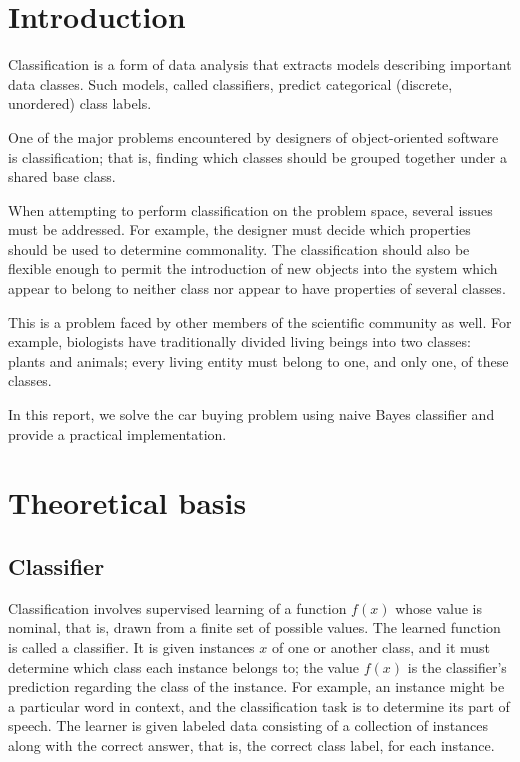 \documentclass[a4paper]{article}
\begin{document}

\newpage
\tableofcontents
\newpage

\section{Introduction}

	Classification is a form of data analysis that extracts models describing
	important data classes. Such models, called classifiers, predict categorical
	(discrete, unordered) class labels.

	One of the major problems encountered by designers of object-oriented
	software is classification; that is, finding which classes should be
	grouped together under a shared base class.

	When attempting to perform classification on the problem space, several
	issues must be addressed. For example, the designer must decide which
	properties should be used to determine commonality. The classification
	should also be flexible enough to permit the introduction of new objects
	into the system which appear to belong to neither class nor appear to have
	properties of several classes.

	This is a problem faced by other members of the scientific community as
	well. For example, biologists have traditionally divided living beings into
	two classes: plants and animals; every living entity must belong to one,
	and only one, of these classes.

	In this report, we solve the car buying problem using naive Bayes classifier
	and provide a practical implementation.

\section{Theoretical basis}

	\subsection{Classifier}

		Classification involves supervised learning of a function $f(x)$
		whose value is nominal, that is, drawn from a finite set of possible
		values. The learned function is called a classifier. It is given
		instances $x$ of one or another class, and it must determine
		which class each instance belongs to; the value $f(x)$ is the
		classifier’s prediction regarding the class of the instance. For
		example, an instance might be a particular word in context, and the
		classification task is to determine its part of speech. The learner
		is given labeled data consisting of a collection of instances
		along with the correct answer, that is, the correct class label,
		for each instance.
\end{document}
